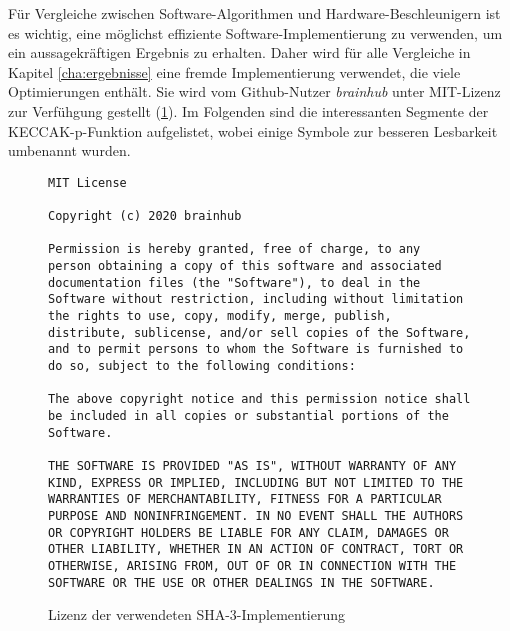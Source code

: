 Für Vergleiche zwischen Software-Algorithmen und Hardware-Beschleunigern ist es wichtig, eine möglichst effiziente Software-Implementierung zu verwenden,
um ein aussagekräftigen Ergebnis zu erhalten. Daher wird für alle Vergleiche in Kapitel \ref{cha:ergebnisse} eine fremde Implementierung verwendet,
die viele Optimierungen enthält. Sie wird vom Github-Nutzer \textit{brainhub} \cite{sha3-impl} unter MIT-Lizenz zur Verfühgung gestellt (\ref{fig:keccak_impl_license}).
Im Folgenden sind die interessanten Segmente der KECCAK-p-Funktion aufgelistet, wobei einige Symbole zur besseren Lesbarkeit umbenannt wurden.

\begin{figure}
\lstset{language=C}
\begin{lstlisting}[label={lst:keccak_impl_license}]
MIT License

Copyright (c) 2020 brainhub

Permission is hereby granted, free of charge, to any
person obtaining a copy of this software and associated
documentation files (the "Software"), to deal in the
Software without restriction, including without limitation
the rights to use, copy, modify, merge, publish,
distribute, sublicense, and/or sell copies of the Software,
and to permit persons to whom the Software is furnished to
do so, subject to the following conditions:

The above copyright notice and this permission notice shall
be included in all copies or substantial portions of the
Software.

THE SOFTWARE IS PROVIDED "AS IS", WITHOUT WARRANTY OF ANY
KIND, EXPRESS OR IMPLIED, INCLUDING BUT NOT LIMITED TO THE
WARRANTIES OF MERCHANTABILITY, FITNESS FOR A PARTICULAR
PURPOSE AND NONINFRINGEMENT. IN NO EVENT SHALL THE AUTHORS
OR COPYRIGHT HOLDERS BE LIABLE FOR ANY CLAIM, DAMAGES OR
OTHER LIABILITY, WHETHER IN AN ACTION OF CONTRACT, TORT OR
OTHERWISE, ARISING FROM, OUT OF OR IN CONNECTION WITH THE
SOFTWARE OR THE USE OR OTHER DEALINGS IN THE SOFTWARE.
\end{lstlisting}
\caption{Lizenz der verwendeten SHA-3-Implementierung}
\label{fig:keccak_impl_license}
\end{figure}

